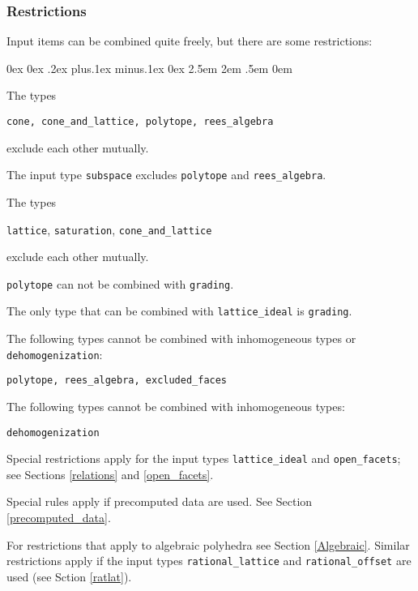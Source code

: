 \documentclass[12pt,a4paper]{scrartcl}
\newcounter{listi}
\newcommand{\stdli}{ \topsep0ex \partopsep0ex %
\parsep.2ex plus.1ex minus.1ex \itemsep0ex%
\leftmargin2.5em \labelwidth2em \labelsep.5em \rightmargin0em}%
\newenvironment{arab}{\begin{list}{\textup{(\arabic{listi})}}%
	{\usecounter{listi}\stdli}}{\end{list}}
\theoremstyle{definition}
\def\ttt{\texttt}
\begin{document}
\subsubsection{Restrictions}

Input items can be combined quite freely, but there are some restrictions:

\begin{arab}
	\item The types
	\begin{center}
		\ttt {cone, cone\_and\_lattice, polytope, rees\_algebra}	
	\end{center}
	exclude each other mutually.
	\item The input type \verb|subspace| excludes \verb|polytope| and \verb|rees_algebra|.
	\item The types
	\begin{center}
		\ttt {lattice}, \ttt{saturation}, \ttt{cone\_and\_lattice}	
	\end{center}
	exclude each other mutually.
	\item \verb|polytope| can not be combined with \verb|grading|.
	\item The only type that can be combined with \ttt{lattice\_ideal} is \ttt{grading}.
	\item The following types cannot be combined with inhomogeneous types or \verb|dehomogenization|:
	\begin{center}
		\ttt{polytope, rees\_algebra, excluded\_faces}
	\end{center}
	\item The following types cannot be combined with inhomogeneous types:
	\begin{center}
		\ttt{dehomogenization}
	\end{center}
	
	\item Special restrictions apply for the input types \verb|lattice_ideal| and \verb|open_facets|; see Sections \ref{relations} and \ref{open_facets}.
	
	\item Special rules apply if precomputed data are used. See Section \ref{precomputed_data}.
	
	\item For restrictions that apply to algebraic polyhedra see Section \ref{Algebraic}. Similar restrictions apply if the input types \ttt{rational\_lattice} and \ttt{rational\_offset} are used (see Sction \ref{ratlat}).
\end{arab}
\end{document}
